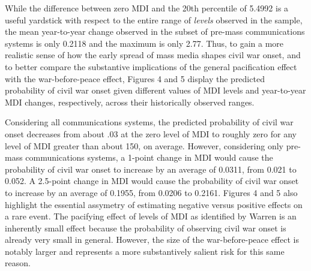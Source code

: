\documentclass[12pt,article,oneside]{memoir}
\begin{document}
\begin{table}[!htbp]
\end{table}

While the difference between zero MDI and the 20th percentile of 5.4992
is a useful yardstick with respect to the entire range of \emph{levels}
observed in the sample, the mean year-to-year change observed in the
subset of pre-mass communications systems is only 0.2118 and the maximum
is only 2.77. Thus, to gain a more realistic sense of how the early
spread of mass media shapes civil war onset, and to better compare the
substantive implications of the general pacification effect with the
war-before-peace effect, Figures 4 and 5 display the predicted
probability of civil war onset given different values of MDI levels and
year-to-year MDI changes, respectively, across their historically
observed ranges.

Considering all communications systems, the predicted probability of
civil war onset decreases from about .03 at the zero level of MDI to
roughly zero for any level of MDI greater than about 150, on average.
However, considering only pre-mass communications systems, a 1-point
change in MDI would cause the probability of civil war onset to increase
by an average of 0.0311, from 0.021 to 0.052. A 2.5-point change in MDI
would cause the probability of civil war onset to increase by an average
of 0.1955, from 0.0206 to 0.2161. Figures 4 and 5 also highlight the
essential assymetry of estimating negative versus positive effects on a
rare event. The pacifying effect of levels of MDI as identified by
Warren is an inherently small effect because the probability of
observing civil war onset is already very small in general. However, the
size of the war-before-peace effect is notably larger and represents a
more substantively salient risk for this same reason.
\end{document}
